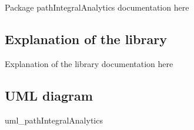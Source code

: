 \documentclass[class=article, crop=false]{standalone}
\begin{document}
Package pathIntegralAnalytics documentation here

\subsection{Explanation of the library}

Explanation of the library  documentation here

\subsection{UML diagram}
{uml_pathIntegralAnalytics}
\end{document}

